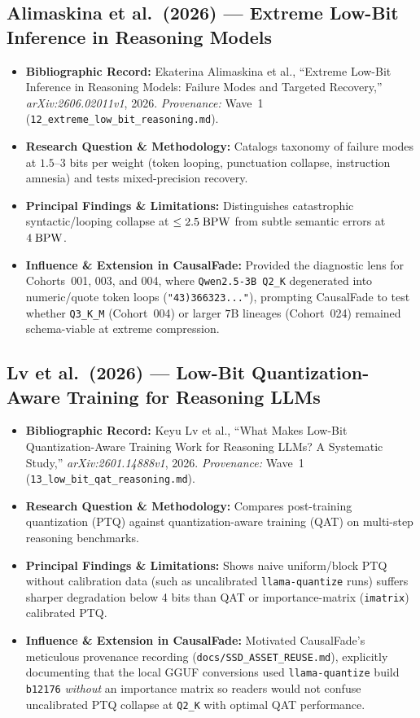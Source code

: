 \subsection{Alimaskina et al.\ (2026) --- Extreme Low-Bit Inference in Reasoning Models \citep{alimaskina2026extreme}}
\begin{itemize}
  \item \textbf{Bibliographic Record:} Ekaterina Alimaskina et al., ``Extreme Low-Bit Inference in Reasoning Models: Failure Modes and Targeted Recovery,'' \emph{arXiv:2606.02011v1}, 2026. \emph{Provenance:} Wave~1 (\texttt{12\_extreme\_low\_bit\_reasoning.md}).
  \item \textbf{Research Question \& Methodology:} Catalogs taxonomy of failure modes at $1.5$--$3$ bits per weight (token looping, punctuation collapse, instruction amnesia) and tests mixed-precision recovery.
  \item \textbf{Principal Findings \& Limitations:} Distinguishes catastrophic syntactic/looping collapse at $\le 2.5\;\mathrm{BPW}$ from subtle semantic errors at $4\;\mathrm{BPW}$.
  \item \textbf{Influence \& Extension in CausalFade:} Provided the diagnostic lens for Cohorts~001, 003, and 004, where \texttt{Qwen2.5-3B Q2\_K} degenerated into numeric/quote token loops (\texttt{"43)366323..."}), prompting CausalFade to test whether \texttt{Q3\_K\_M} (Cohort~004) or larger $7\text{B}$ lineages (Cohort~024) remained schema-viable at extreme compression.
\end{itemize}

\subsection{Lv et al.\ (2026) --- Low-Bit Quantization-Aware Training for Reasoning LLMs \citep{lv2026reasoningqat}}
\begin{itemize}
  \item \textbf{Bibliographic Record:} Keyu Lv et al., ``What Makes Low-Bit Quantization-Aware Training Work for Reasoning LLMs? A Systematic Study,'' \emph{arXiv:2601.14888v1}, 2026. \emph{Provenance:} Wave~1 (\texttt{13\_low\_bit\_qat\_reasoning.md}).
  \item \textbf{Research Question \& Methodology:} Compares post-training quantization (PTQ) against quantization-aware training (QAT) on multi-step reasoning benchmarks.
  \item \textbf{Principal Findings \& Limitations:} Shows naive uniform/block PTQ without calibration data (such as uncalibrated \texttt{llama-quantize} runs) suffers sharper degradation below 4 bits than QAT or importance-matrix (\texttt{imatrix}) calibrated PTQ.
  \item \textbf{Influence \& Extension in CausalFade:} Motivated CausalFade's meticulous provenance recording (\texttt{docs/SSD\_ASSET\_REUSE.md}), explicitly documenting that the local GGUF conversions used \texttt{llama-quantize} build \texttt{b12176} \emph{without} an importance matrix so readers would not confuse uncalibrated PTQ collapse at \texttt{Q2\_K} with optimal QAT performance.
\end{itemize}

